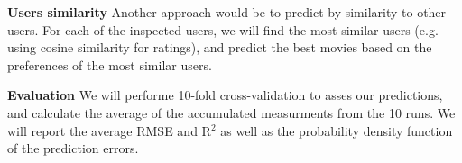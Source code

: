 \textbf{Users similarity}
Another approach would be to predict by similarity to other users. For each of the inspected users, we will find the most similar users (e.g. using cosine similarity for ratings), and predict the best movies based on the preferences of the most similar users.

\textbf{Evaluation}
We will performe 10-fold cross-validation to asses our predictions, and calculate the average of the accumulated measurments from the 10 runs. We will report the average RMSE and R$^2$ as well as the probability density function of the prediction errors.

